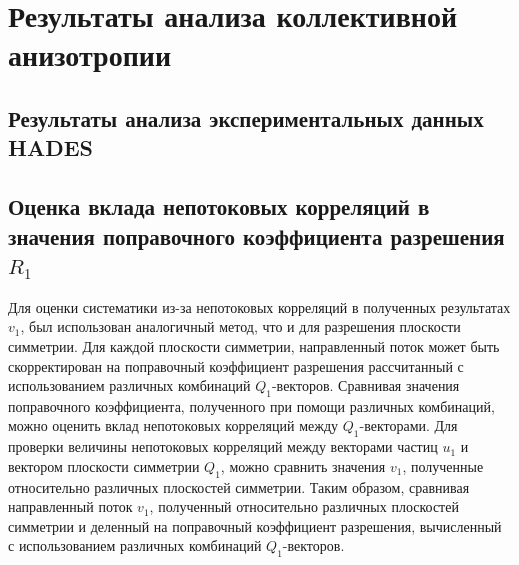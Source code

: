 \chapter{Результаты анализа коллективной анизотропии}

\section{Результаты анализа экспериментальных данных HADES}

\section{Оценка вклада непотоковых корреляций в значения поправочного коэффициента разрешения $R_1$}

Для оценки систематики из-за непотоковых корреляций в полученных результатах $v_1$, был использован аналогичный метод, что и для разрешения плоскости симметрии. 
Для каждой плоскости симметрии, направленный поток может быть скорректирован на поправочный коэффициент разрешения рассчитанный с использованием различных комбинаций $Q_1$-векторов.
Сравнивая значения поправочного коэффициента, полученного при помощи различных комбинаций, можно оценить вклад непотоковых корреляций между $Q_1$-векторами.
Для проверки величины непотоковых корреляций между векторами частиц $u_1$ и вектором плоскости симметрии $Q_1$, можно сравнить значения $v_1$, полученные относительно различных плоскостей симметрии.
Таким образом, сравнивая направленный поток $v_1$, полученный относительно различных плоскостей симметрии и деленный на поправочный коэффициент разрешения, вычисленный с использованием различных комбинаций $Q_1$-векторов.

